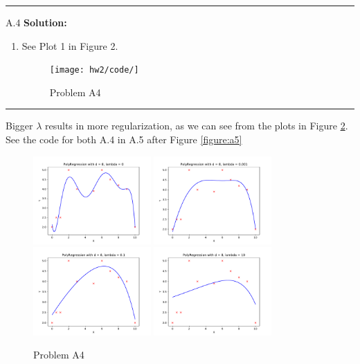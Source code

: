 \documentclass{article}
\newcommand{\1}{\mathbf{1}}
\begin{document}
\noindent\rule{\textwidth}{1pt}
A.4 {\bf Solution:}\\
\begin{enumerate}
    \item See Plot 1 in Figure 2. 
    \begin{figure}[h!]
            \centering
            \texttt{[image: hw2/code/]}
            \caption{Problem A4}
            \label{figure:a4}
    \end{figure}

\end{enumerate}
\noindent\rule{\textwidth}{1pt}
Bigger $\lambda$ results in more regularization, as we can see from the plots in Figure \ref{figure:a4}. See the code for both A.4 in A.5 after Figure \ref{figure:a5}
    \begin{figure}[h!]
            \centering
            \includegraphics[width=0.4\textwidth]{hw1/code/Polynomial_Regression/figures/A4_l0.pdf}
            \includegraphics[width=0.4\textwidth]{hw1/code/Polynomial_Regression/figures/A4_l0001.pdf}
            \includegraphics[width=0.4\textwidth]{hw1/code/Polynomial_Regression/figures/A4_l01.pdf}
            \includegraphics[width=0.4\textwidth]{hw1/code/Polynomial_Regression/figures/A4_l10.pdf}
            \caption{Problem A4}
            \label{figure:a4}
    \end{figure}
\end{document}
